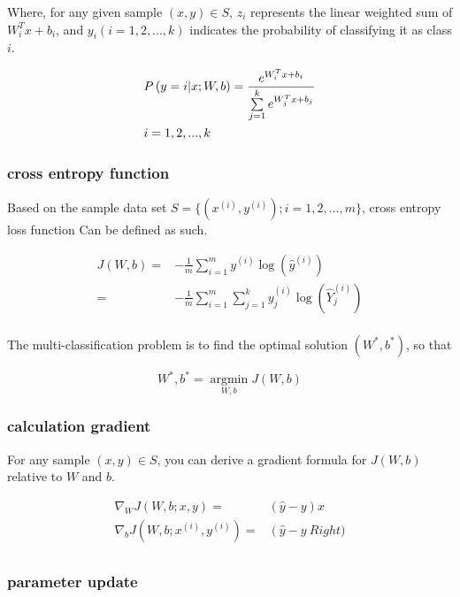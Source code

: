 \begin{content}
Where, for any given sample $ (x, y) \in S $, $ z_i $ represents the linear weighted sum of $W_i^Tx+b_i$, and $y_i(i=1,2,...,k )$ indicates the probability of classifying it as class $i$.

\[\begin{gathered}
  P\left( {y = i|x;W,b} \right) = \frac{{{e^{W_i^Tx + b_i}}}}{{\sum\limits_{j = 1}^k { {e^{W_j^Tx + b_j}}} }} \hfill \\
  i = 1,2,...,k \hfill \\ 
\end{gathered} \]


\subsubsection{cross entropy function}

Based on the sample data set $ S = \{ ({x^{(i)}}, {y^{(i)}});i = 1,2,...,m\} $, cross entropy loss function Can be defined as such.

\[\begin{aligned}
  J(W,b) = & - \frac{1}{m}\sum\limits_{i = 1}^m {{y^{(i)}}\log \left( {{{\widehat y} ^{(i)}}} \right)} \\ 
   = & - \frac{1}{m}\sum\limits_{i = 1}^m {\sum\limits_{j = 1}^k {y_j^{(i)}\log \left( {\widehat Y_j^{(i)}} \right)} } \\
\end{aligned} \]

The  multi-classification problem is to find the optimal solution $(W^*,b^*)$, so that

\[W^*,b^* = \mathop {\arg \min }\limits_{W,b} J(W,b)\]

\subsubsection{calculation gradient}

For any sample $(x,y) \in S $, you can derive a gradient formula for $ J(W,b) $ relative to $ W $ and $ b $.

\[\begin{aligned}
  {\nabla _W}J\left( {W,b;x,y} \right) = & \left( {\widehat y - y} \right)x \\ 
  {\nabla _b}J\left( {W,b;{x^{(i)}},{y^{(i)}}} \right) = & \left( {\widehat y - y} \ Right) \\ 
\end{aligned} \]


\subsubsection{parameter update}


\end{content}
